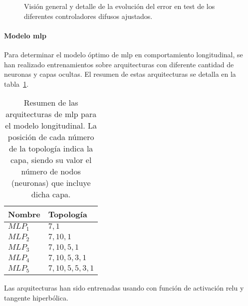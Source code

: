 \begin{figure}
	\centering
	\qquad
	\caption[Evolución del error en test de los controladores difusos ajustados]{Visión general y detalle de la evolución del error en test de los diferentes controladores difusos ajustados.}
	\label{fig:adjusted-fcs}
\end{figure}



\paragraph{Modelo \ac{mlp}}

Para determinar el modelo óptimo de \ac{mlp} en comportamiento longitudinal, se han realizado entrenamientos sobre arquitecturas con diferente cantidad de neuronas y capas ocultas. El resumen de estas arquitecturas se detalla en la tabla~\ref{tbl:cf-mlp-architectures}.

\begin{table}[t]
	\caption[Arquitecturas de \ac{mlp} para el modelo longitudinal]{Resumen de las arquitecturas de \ac{mlp} para el modelo longitudinal. La posición de cada número de la topología indica la capa, siendo su valor el número de nodos (neuronas) que incluye dicha capa.}
	\label{tbl:cf-mlp-architectures}
	\begin{tabular}{ll}
		\toprule
		Nombre & Topología \\
		\midrule
		$MLP_1$ & $7, 1$ \\
		$MLP_2$ & $7, 10, 1$ \\
		$MLP_3$ & $7, 10, 5, 1$ \\
		$MLP_4$ & $7, 10, 5, 3, 1$ \\
		$MLP_5$ & $7, 10, 5, 5, 3, 1$ \\
		\bottomrule
	\end{tabular}
\end{table}

Las arquitecturas han sido entrenadas usando con función de activación \ac{relu} y tangente hiperbólica. 


